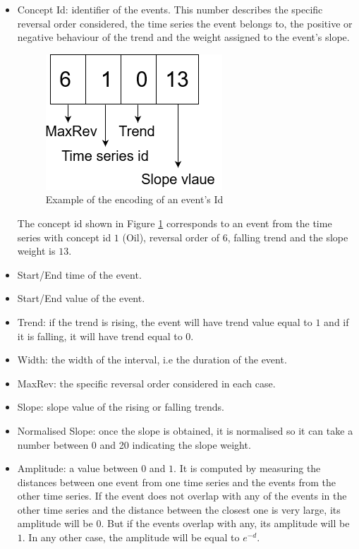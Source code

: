 \documentclass[a4, 11pt]{article}
\begin{document}
\begin{itemize}
    \item Concept Id: identifier of the events. This number describes the specific reversal order considered, the time series the event belongs to, the positive or negative behaviour of the trend and the weight assigned to the event's slope. 
           \begin{figure}[!ht]
           \centering
           \includegraphics[scale=0.5]{Images/id.png}
           \caption{Example of the encoding of an event's Id}
           \label{fig:id}
       \end{figure}
        The concept id shown in Figure \ref{fig:id} corresponds to an event from the time series with concept id $1$ (Oil), reversal order of $6$, falling trend and the slope weight is $13$. 
    \item Start/End time of the event.
    \item Start/End value of the event. 
    \item Trend: if the trend is rising, the event will have trend value equal to $1$ and if it is falling, it will have trend equal to $0$.
    \item Width: the width of the interval, i.e the duration of the event.  
    \item MaxRev: the specific reversal order considered in each case.
    \item Slope: slope value of the rising or falling trends. 
    \item Normalised Slope: once the slope is obtained, it is normalised so it can take a number between 0 and 20 indicating the slope weight. 
    \item Amplitude: a value between $0$ and $1$. It is computed by measuring the distances between one event from one time series and the events from the other time series. If the event does not overlap with any of the events in the other time series and the distance between the closest one is very large, its amplitude will be 0. But if the events overlap with any, its amplitude will be $1$. In any other case, the amplitude will be equal to $e^{-d}$.
\end{itemize}
\end{document}
